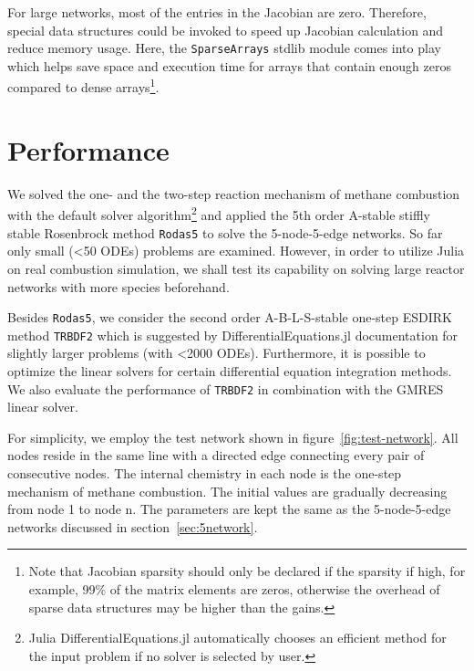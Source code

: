 For large networks, most of the entries in the Jacobian are zero. Therefore, special data structures could be invoked to speed up Jacobian calculation and reduce memory usage. Here, the \texttt{SparseArrays} stdlib module comes into play which helps save space and execution time for arrays that contain enough zeros compared to dense arrays\footnote{Note that Jacobian sparsity should only be declared if the sparsity if high, for example, 99\% of the matrix elements are zeros, otherwise the overhead of sparse data structures may be higher than the gains.}. 

\section{Performance}

We solved the one- and the two-step reaction mechanism of methane combustion with the default solver algorithm\footnote{Julia DifferentialEquations.jl automatically chooses an efficient method for the input problem if no solver is selected by user.} and applied the 5th order A-stable stiffly stable Rosenbrock method \texttt{Rodas5} to solve the 5-node-5-edge networks. So far only small (<50 ODEs) problems are examined. However, in order to utilize Julia on real combustion simulation, we shall test its capability on solving large reactor networks with more species beforehand.

Besides \texttt{Rodas5}, we consider the second order A-B-L-S-stable one-step ESDIRK method \texttt{TRBDF2} which is suggested by DifferentialEquations.jl documentation for slightly larger problems (with <2000 ODEs). Furthermore, it is possible to optimize the linear solvers for certain differential equation integration methods. We also evaluate the performance of \texttt{TRBDF2} in combination with the GMRES linear solver.

For simplicity, we employ the test network shown in figure~\ref{fig:test-network}. All nodes reside in the same line with a directed edge connecting every pair of consecutive nodes. The internal chemistry in each node is the one-step mechanism of methane combustion. The initial values are gradually decreasing from node 1 to node n. The parameters are kept the same as the 5-node-5-edge networks discussed in section~\ref{sec:5network}.

